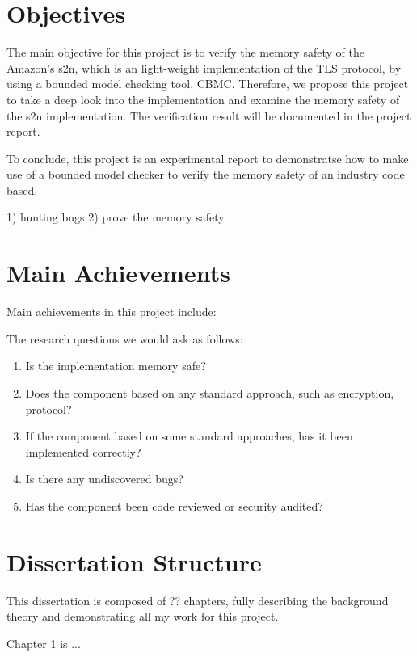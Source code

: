 \section{Objectives}
The main objective for this project is to verify the memory safety of the Amazon's s2n, which is an light-weight implementation of the TLS protocol, by using a bounded model checking tool, CBMC. Therefore, we propose this project to take a deep look into the implementation and examine the memory safety of the s2n implementation. The verification result will be documented in the project report.


To conclude, this project is an experimental report to demonstratse how to make use of a bounded model checker to verify the memory safety of an industry code based.

1) hunting bugs
2) prove the memory safety 


\section{Main Achievements}
Main achievements in this project include:

The research questions we would ask as follows:

\begin{enumerate}
    \item Is the implementation memory safe?
    \item Does the component based on any standard approach, such as encryption, protocol?
    \item If the component based on some standard approaches, has it been implemented correctly?
    \item Is there any undiscovered bugs?
    \item Has the component been code reviewed or security audited?
\end{enumerate}

\section{Dissertation Structure}
This dissertation is composed of ?? chapters, fully describing the background theory and demonstrating all my work for this project.

Chapter 1 is ...